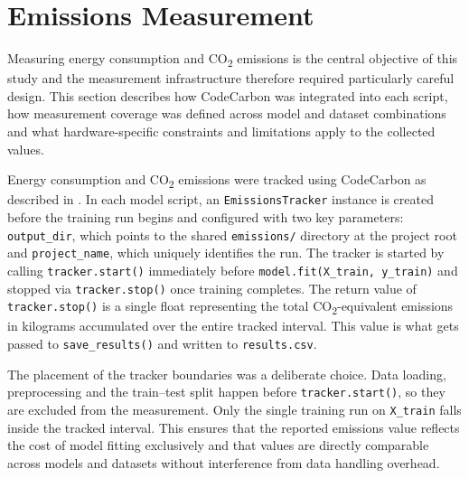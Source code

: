 \section{Emissions Measurement}
\label{implementation_emissions}

Measuring energy consumption and CO\textsubscript{2} emissions is the central objective of this study and the measurement infrastructure therefore required particularly careful design. This section describes how CodeCarbon was integrated into each script, how measurement coverage was defined across model and dataset combinations and what hardware-specific constraints and limitations apply to the collected values.

Energy consumption and CO\textsubscript{2} emissions were tracked using CodeCarbon as described in . In each model script, an \texttt{EmissionsTracker} instance is created before the training run begins and configured with two key parameters: \texttt{output\_dir}, which points to the shared \texttt{emissions/} directory at the project root and \texttt{project\_name}, which uniquely identifies the run. The tracker is started by calling \texttt{tracker.start()} immediately before \texttt{model.fit(X\_train, y\_train)} and stopped via \texttt{tracker.stop()} once training completes. The return value of \texttt{tracker.stop()} is a single float representing the total CO\textsubscript{2}-equivalent emissions in kilograms accumulated over the entire tracked interval. This value is what gets passed to \texttt{save\_results()} and written to \texttt{results.csv}.

The placement of the tracker boundaries was a deliberate choice. Data loading, preprocessing and the train--test split happen before \texttt{tracker.start()}, so they are excluded from the measurement. Only the single training run on \texttt{X\_train} falls inside the tracked interval. This ensures that the reported emissions value reflects the cost of model fitting exclusively and that values are directly comparable across models and datasets without interference from data handling overhead.

